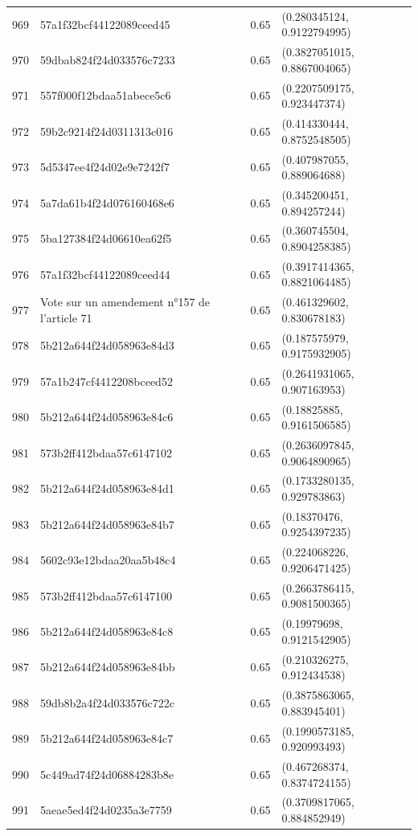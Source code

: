 \begin{table}[ht]
\begin{tabular}{rlrl}
  969 & 57a1f32bcf44122089ceed45 & 0.65 & (0.280345124, 0.9122794995) \\ 
  970 & 59dbab824f24d033576c7233 & 0.65 & (0.3827051015, 0.8867004065) \\ 
  971 & 557f000f12bdaa51abece5c6 & 0.65 & (0.2207509175, 0.923447374) \\ 
  972 & 59b2c9214f24d0311313c016 & 0.65 & (0.414330444, 0.8752548505) \\ 
  973 & 5d5347ee4f24d02e9e7242f7 & 0.65 & (0.407987055, 0.889064688) \\ 
  974 & 5a7da61b4f24d076160468e6 & 0.65 & (0.345200451, 0.894257244) \\ 
  975 & 5ba127384f24d06610ea62f5 & 0.65 & (0.360745504, 0.8904258385) \\ 
  976 & 57a1f32bcf44122089ceed44 & 0.65 & (0.3917414365, 0.8821064485) \\ 
  977 & Vote sur un amendement n°157 de l'article 71 & 0.65 & (0.461329602, 0.830678183) \\ 
  978 & 5b212a644f24d058963e84d3 & 0.65 & (0.187575979, 0.9175932905) \\ 
  979 & 57a1b247cf4412208bceed52 & 0.65 & (0.2641931065, 0.907163953) \\ 
  980 & 5b212a644f24d058963e84c6 & 0.65 & (0.18825885, 0.9161506585) \\ 
  981 & 573b2ff412bdaa57c6147102 & 0.65 & (0.2636097845, 0.9064890965) \\ 
  982 & 5b212a644f24d058963e84d1 & 0.65 & (0.1733280135, 0.929783863) \\ 
  983 & 5b212a644f24d058963e84b7 & 0.65 & (0.18370476, 0.9254397235) \\ 
  984 & 5602c93e12bdaa20aa5b48c4 & 0.65 & (0.224068226, 0.9206471425) \\ 
  985 & 573b2ff412bdaa57c6147100 & 0.65 & (0.2663786415, 0.9081500365) \\ 
  986 & 5b212a644f24d058963e84c8 & 0.65 & (0.19979698, 0.9121542905) \\ 
  987 & 5b212a644f24d058963e84bb & 0.65 & (0.210326275, 0.912434538) \\ 
  988 & 59db8b2a4f24d033576c722c & 0.65 & (0.3875863065, 0.883945401) \\ 
  989 & 5b212a644f24d058963e84c7 & 0.65 & (0.1990573185, 0.920993493) \\ 
  990 & 5c449ad74f24d06884283b8e & 0.65 & (0.467268374, 0.8374724155) \\ 
  991 & 5aeae5ed4f24d0235a3e7759 & 0.65 & (0.3709817065, 0.884852949) \\ 

\end{tabular}
\end{table}
